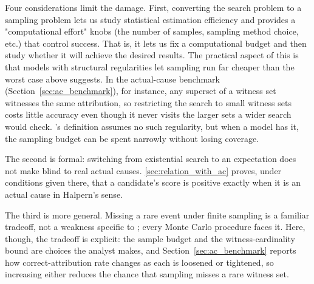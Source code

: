 Four considerations limit the damage. First, converting the search problem to a sampling problem 
lets us study statistical estimation efficiency and provides a "computational effort" knobs (the number of samples, sampling method choice, etc.)
that control success. That is, it lets us fix a computational budget and then study whether it will achieve the desired results. 
The practical aspect of this is that models with
structural regularities let sampling run far cheaper than the worst case above
suggests. In the actual-cause benchmark (Section~\ref{sec:ac_benchmark}),
for instance, any superset of a witness set witnesses the same attribution, so
restricting the search to small witness sets costs little accuracy even though
it never visits the larger sets a wider search would check. \ourapproach's
definition assumes no such regularity, but when a model has it, the sampling
budget can be spent narrowly without losing coverage.

The second is formal: switching from existential search to an expectation does
not make \ourapproach blind to real actual causes. \cref{sec:relation_with_ac}
proves, under conditions given there, that a candidate's \ourapproach score is
positive exactly when it is an actual cause in Halpern's sense.

The third is more general. Missing a rare event under finite sampling is a
familiar tradeoff, not a weakness specific to \ourapproach; every Monte Carlo
procedure faces it. Here, though, the tradeoff is explicit: the sample budget
and the witness-cardinality bound are choices the analyst makes, and
Section~\ref{sec:ac_benchmark} reports how correct-attribution rate changes as
each is loosened or tightened, so increasing either reduces the chance that
sampling misses a rare witness set.

